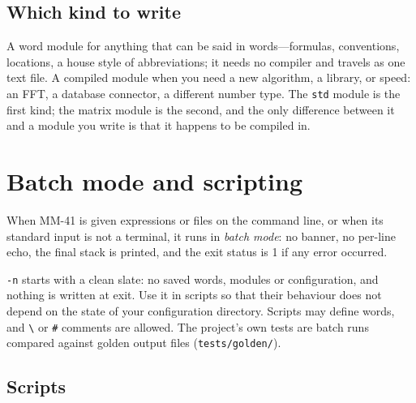 \documentclass[11pt,letterpaper]{article}
\newcommand{\code}[1]{\texttt{#1}}
\begin{document}
\subsection{Which kind to write}

A word module for anything that can be said in words---formulas, conventions, locations, a house style of abbreviations; it needs no compiler and travels as one text file. A compiled module when you need a new algorithm, a library, or speed: an FFT, a database connector, a different number type. The \code{std} module is the first kind; the matrix module is the second, and the only difference between it and a module you write is that it happens to be compiled in.

\section{Batch mode and scripting}

When MM-41 is given expressions or files on the command line, or when its standard input is not a terminal, it runs in \emph{batch mode}: no banner, no per-line echo, the final stack is printed, and the exit status is 1 if any error occurred.
\code{-n} starts with a clean slate: no saved words, modules or configuration, and nothing is written at exit. Use it in scripts so that their behaviour does not depend on the state of your configuration directory. Scripts may define words, and \code{\textbackslash} or \code{\#} comments are allowed. The project's own tests are batch runs compared against golden output files (\code{tests/golden/}).

\subsection{Scripts}
\end{document}
